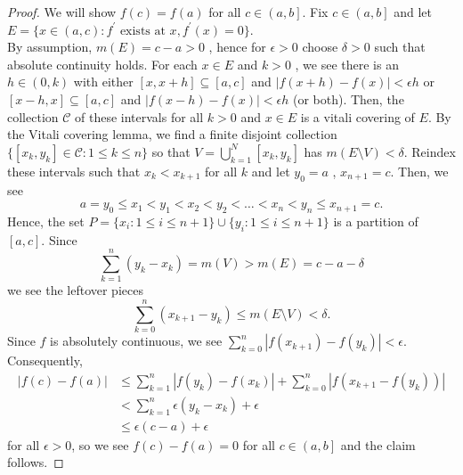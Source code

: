 \begin{proof}
	We will show \(f\left( c \right)  = f\left( a \right) \) for all \(c \in \left( a, b \right] \). Fix \(c \in \left( a, b \right] \) and let \(E = \{x \in \left( a, c \right) : f^{\prime} \text{ exists at } x,  f^{\prime}\left( x \right)  = 0\}\).\\
	By assumption, \(m\left( E \right)  = c - a > 0\) , hence for \(\epsilon > 0\) choose \(\delta > 0\) such that absolute continuity holds. For each \(x \in E\) and \( k > 0\) , we see there is an \(h \in \left( 0, k \right) \) with either \(\left[ x, x + h \right] \subseteq \left[ a, c \right] \) and \(\left| f\left( x + h \right) - f\left( x \right)   \right| < \epsilon h \) or \(\left[ x - h, x \right] \subseteq \left[ a, c \right] \) and \(\left| f\left( x - h \right) - f\left( x \right)  \right| < \epsilon h\) (or both). Then, the collection \(\mathscr{C}\) of these intervals for all \(k > 0\) and \(x \in E\) is a vitali covering of \(E\). By the Vitali covering lemma, we find a finite disjoint collection \(\{\left[ x_{k}, y_{k} \right] \in \mathscr{C} : 1 \le k \le n\} \) so that \(V = \bigcup_{k=1} ^{N}\left[ x_{k}, y_{k} \right] \) has \(m\left( E \setminus V \right)  < \delta\). Reindex these intervals such that \(x_{k} < x_{k+1}\) for all \(k\) and let \(y_0 = a\) , \(x_{n + 1} = c\). Then, we see \[
	a = y_0 \le x_1 < y_1 < x_2 < y_2 < \ldots < x_{n} < y_{n} \le x_{n + 1} = c
	.\]
	Hence, the set \(P = \{x_{i} : 1 \le i \le n + 1\} \cup \{y_{i} : 1 \le i \le n + 1\}  \) is a partition of \(\left[ a, c \right] \). Since \[
		\sum_{k=1}^{n} \left( y_{k} - x_{k} \right)  = m\left( V \right)  > m\left( E \right)  = c - a - \delta
	\]
	we see the leftover pieces \[
		\sum_{k=0}^{n} \left( x_{k+1} - y_{k} \right) \le m\left( E \setminus V \right) < \delta
	.\]
	Since \(f\) is absolutely continuous, we see \(\sum_{k=0}^{n} \left| f\left( x_{k+1} \right) - f\left( y_{k} \right)\right| < \epsilon  \).\\
Consequently,
\begin{align*}
	\left| f\left( c \right)  - f\left( a \right)  \right| &\le \sum_{k=1}^{n} \left| f\left( y_{k} \right) - f\left( x_{k} \right)   \right| + \sum_{k=0}^{n} \left| f\left( x_{k+1}- f\left( y_{k} \right)  \right)  \right| \\
							       &< \sum_{k=1}^{n} \epsilon\left( y_{k} - x_{k} \right) + \epsilon \\
							       &\le \epsilon\left( c-a \right)  + \epsilon
\end{align*} for all \(\epsilon > 0\), so we see \(f\left( c \right) - f\left( a \right)  = 0\) for all \(c \in \left( a, b \right] \) and the claim follows.
\end{proof}
